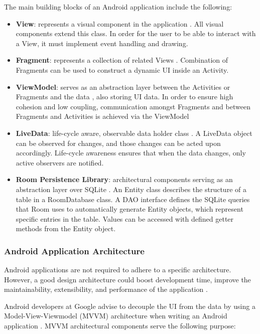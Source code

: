 \documentclass{article}
\begin{document}
\bigskip 
\noindent The main building blocks of an Android application include the following: 

\begin{itemize}
    \item \textbf{View}: represents a visual component in the application \cite{android_view}. All visual components extend this class. In order for the user to be able to interact with a View, it must implement event handling and drawing. 
    \item \textbf{Fragment}: represents a collection of related Views \cite{android_fragment}. Combination of Fragments can be used to construct a dynamic UI inside an Activity. 
    \item \textbf{ViewModel}: serves as an abstraction layer between the Activities or Fragments and the data \cite{android_view_model}, also storing UI data. In order to ensure high cohesion and low coupling, communication amongst Fragments and between Fragments and Activities is achieved via the ViewModel \cite{android_app_architecture}
    \item \textbf{LiveData}: life-cycle aware, observable data holder class \cite{android_live_data}. A LiveData object can be observed for changes, and those changes can be acted upon accordingly. Life-cycle awareness ensures that when the data changes, only active observers are notified.
    \item \textbf{Room Persistence Library}: architectural components serving as an abstraction layer over SQLite \cite{android_room}. An Entity class describes the structure of a table in a RoomDatabase class. A DAO interface defines the SQLite queries that Room uses to automatically generate Entity objects, which represent specific entries in the table. Values can be accessed with defined getter methods from the Entity object.
\end{itemize}

\subsubsection{Android Application Architecture}
Android applications are not required to adhere to a specific architecture. However, a good design architecture could boost development time, improve the maintainability, extensibility, and performance of the application \cite{passive_mvc}. 

\bigskip
\noindent Android developers at Google advise to decouple the UI from the data by using a Model-View-Viewmodel (MVVM) \cite{mvvm} architecture when writing an Android application \cite{android_app_architecture}. MVVM  architectural components serve the following purpose: 
\end{document}
